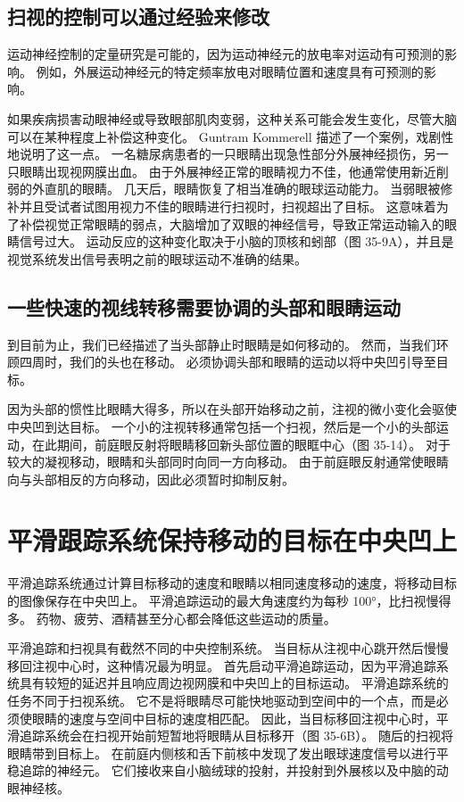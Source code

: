 \subsection{扫视的控制可以通过经验来修改}
运动神经控制的定量研究是可能的，因为运动神经元的放电率对运动有可预测的影响。 例如，外展运动神经元的特定频率放电对眼睛位置和速度具有可预测的影响。

如果疾病损害动眼神经或导致眼部肌肉变弱，这种关系可能会发生变化，尽管大脑可以在某种程度上补偿这种变化。 Guntram Kommerell 描述了一个案例，戏剧性地说明了这一点。 一名糖尿病患者的一只眼睛出现急性部分外展神经损伤，另一只眼睛出现视网膜出血。 由于外展神经正常的眼睛视力不佳，他通常使用新近削弱的外直肌的眼睛。 几天后，眼睛恢复了相当准确的眼球运动能力。 当弱眼被修补并且受试者试图用视力不佳的眼睛进行扫视时，扫视超出了目标。 这意味着为了补偿视觉正常眼睛的弱点，大脑增加了双眼的神经信号，导致正常运动输入的眼睛信号过大。 运动反应的这种变化取决于小脑的顶核和蚓部（图 35-9A），并且是视觉系统发出信号表明之前的眼球运动不准确的结果。

\subsection{一些快速的视线转移需要协调的头部和眼睛运动}
到目前为止，我们已经描述了当头部静止时眼睛是如何移动的。 然而，当我们环顾四周时，我们的头也在移动。 必须协调头部和眼睛的运动以将中央凹引导至目标。

因为头部的惯性比眼睛大得多，所以在头部开始移动之前，注视的微小变化会驱使中央凹到达目标。 一个小的注视转移通常包括一个扫视，然后是一个小的头部运动，在此期间，前庭眼反射将眼睛移回新头部位置的眼眶中心（图 35-14）。 对于较大的凝视移动，眼睛和头部同时向同一方向移动。 由于前庭眼反射通常使眼睛向与头部相反的方向移动，因此必须暂时抑制反射。


\section{平滑跟踪系统保持移动的目标在中央凹上}
平滑追踪系统通过计算目标移动的速度和眼睛以相同速度移动的速度，将移动目标的图像保存在中央凹上。 平滑追踪运动的最大角速度约为每秒 100°，比扫视慢得多。 药物、疲劳、酒精甚至分心都会降低这些运动的质量。

平滑追踪和扫视具有截然不同的中央控制系统。 当目标从注视中心跳开然后慢慢移回注视中心时，这种情况最为明显。 首先启动平滑追踪运动，因为平滑追踪系统具有较短的延迟并且响应周边视网膜和中央凹上的目标运动。 平滑追踪系统的任务不同于扫视系统。 它不是将眼睛尽可能快地驱动到空间中的一个点，而是必须使眼睛的速度与空间中目标的速度相匹配。 因此，当目标移回注视中心时，平滑追踪系统会在扫视开始前短暂地将眼睛从目标移开（图 35-6B）。 随后的扫视将眼睛带到目标上。 在前庭内侧核和舌下前核中发现了发出眼球速度信号以进行平稳追踪的神经元。 它们接收来自小脑绒球的投射，并投射到外展核以及中脑的动眼神经核。

